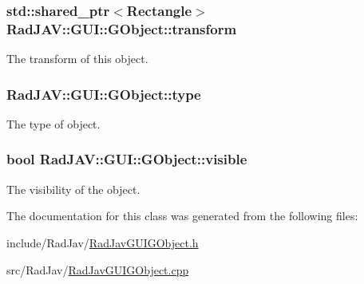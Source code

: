 \subsubsection[{\texorpdfstring{transform}{transform}}]{\setlength{\rightskip}{0pt plus 5cm}std\+::shared\+\_\+ptr$<${\bf Rectangle}$>$ Rad\+J\+A\+V\+::\+G\+U\+I\+::\+G\+Object\+::transform\hspace{0.3cm}{\ttfamily [protected]}}\hypertarget{class_rad_j_a_v_1_1_g_u_i_1_1_g_object_abfe4fed9fc8c89417082f6c39575b5a3}{}\label{class_rad_j_a_v_1_1_g_u_i_1_1_g_object_abfe4fed9fc8c89417082f6c39575b5a3}


The transform of this object. 

\subsubsection[{\texorpdfstring{type}{type}}]{ Rad\+J\+A\+V\+::\+G\+U\+I\+::\+G\+Object\+::type\hspace{0.3cm}{\ttfamily [protected]}}\hypertarget{class_rad_j_a_v_1_1_g_u_i_1_1_g_object_a11b7855ac57a7bfc041b87f0cdd0abd3}{}\label{class_rad_j_a_v_1_1_g_u_i_1_1_g_object_a11b7855ac57a7bfc041b87f0cdd0abd3}


The type of object. 

\subsubsection[{\texorpdfstring{visible}{visible}}]{\setlength{\rightskip}{0pt plus 5cm}bool Rad\+J\+A\+V\+::\+G\+U\+I\+::\+G\+Object\+::visible\hspace{0.3cm}{\ttfamily [protected]}}\hypertarget{class_rad_j_a_v_1_1_g_u_i_1_1_g_object_a5c9f1e09ab9ed387d0b069e940beed72}{}\label{class_rad_j_a_v_1_1_g_u_i_1_1_g_object_a5c9f1e09ab9ed387d0b069e940beed72}


The visibility of the object. 



The documentation for this class was generated from the following files\+:\begin{DoxyCompactItemize}
\item 
include/\+Rad\+Jav/\hyperlink{_rad_jav_g_u_i_g_object_8h}{Rad\+Jav\+G\+U\+I\+G\+Object.\+h}\item 
src/\+Rad\+Jav/\hyperlink{_rad_jav_g_u_i_g_object_8cpp}{Rad\+Jav\+G\+U\+I\+G\+Object.\+cpp}\end{DoxyCompactItemize}

